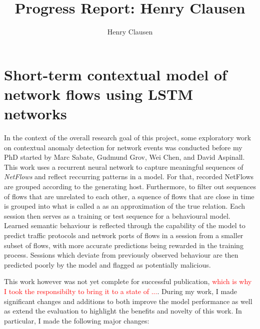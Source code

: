 \documentclass[a4paper,12pt,twoside]{report}
\makeatletter
\newcommand*{\toccontents}{\@starttoc{toc}}
\makeatother
\begin{document}
\title{\LARGE {\bf Progress Report: Henry Clausen}\\
 \vspace*{-5mm}
}
\author{Henry Clausen}

\maketitle



\toccontents



\chapter{Short-term contextual model of network flows using LSTM networks}

In the context of the overall research goal of this project, some exploratory work on contextual anomaly detection for network events was conducted before my PhD started by Marc Sabate, Gudmund Grov, Wei Chen, and David Aspinall. 
This work uses a recurrent neural network to capture meaningful sequences of \textit{NetFlows} and reflect reccurring patterns in a model. For that, recorded NetFlows are grouped according to the generating host. Furthermore, to filter out sequences of flows that are unrelated to each other, a squence of flows that are close in time is grouped into what is called a  as an approximation of the true relation. Each session then serves as a training or test sequence for a behavioural model. Learned semantic behaviour is reflected through the capability of the model to predict traffic protocols and network ports of flows in a session from a smaller subset of flows, with more accurate predictions being rewarded in the training process. Sessions which deviate from previously observed behaviour are then predicted poorly by the model and flagged as potentially malicious.

This work however was not yet complete for successful publication, \textcolor{red}{which is why I took the responsibilty to bring it to a state of ...}. During my work, I made significant changes and additions to both improve the model performance as well as extend the evaluation to highlight the benefits and novelty of this work. 
In particular, I made the following major changes:
\end{document}
